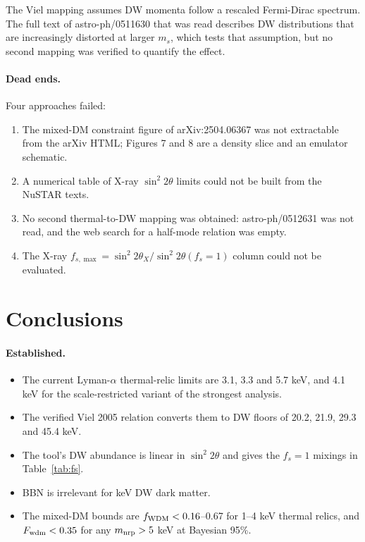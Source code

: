 \documentclass[11pt,a4paper]{article}
\begin{document}
The Viel mapping assumes DW momenta follow a rescaled Fermi-Dirac spectrum. The full text of astro-ph/0511630 that was read describes DW distributions that are increasingly distorted at larger $m_s$, which tests that assumption, but no second mapping was verified to quantify the effect.

\paragraph{Dead ends.} Four approaches failed:
\begin{enumerate}
\item The mixed-DM constraint figure of arXiv:2504.06367 was not extractable from the arXiv HTML; Figures 7 and 8 are a density slice and an emulator schematic.
\item A numerical table of X-ray $\sin^2 2\theta$ limits could not be built from the NuSTAR texts.
\item No second thermal-to-DW mapping was obtained: astro-ph/0512631 was not read, and the web search for a half-mode relation was empty.
\item The X-ray $f_{s,\max}=\sin^2 2\theta_X/\sin^2 2\theta(f_s=1)$ column could not be evaluated.
\end{enumerate}

\section{Conclusions}
\paragraph{Established.}
\begin{itemize}
\item The current Lyman-$\alpha$ thermal-relic limits are 3.1, 3.3 and 5.7 keV, and 4.1 keV for the scale-restricted variant of the strongest analysis.
\item The verified Viel 2005 relation converts them to DW floors of 20.2, 21.9, 29.3 and 45.4 keV.
\item The tool's DW abundance is linear in $\sin^2 2\theta$ and gives the $f_s=1$ mixings in Table~\ref{tab:fs}.
\item BBN is irrelevant for keV DW dark matter.
\item The mixed-DM bounds are $f_{\rm WDM}<0.16$--0.67 for 1--4 keV thermal relics, and $F_{\rm wdm}<0.35$ for any $m_{\rm nrp}>5$ keV at Bayesian 95\%.
\end{itemize}
\end{document}

